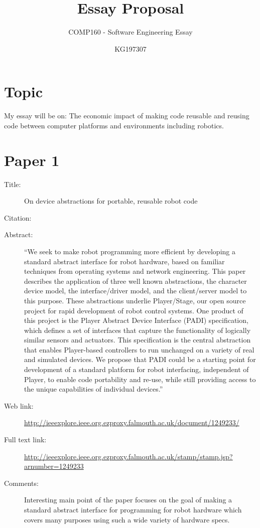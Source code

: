 \documentclass{scrartcl}
\title{Essay Proposal}
\subtitle{COMP160 - Software Engineering Essay}
\author{KG197307}
\begin{document}
\maketitle

\section*{Topic}

My essay will be on:
The economic impact of making code reusable and reusing code between computer platforms and environments including robotics.

\section*{Paper 1}
\begin{description}
\item[Title:] On device abstractions for portable, reusable robot code
\item[Citation:] \cite{RobotVaughan}
\item[Abstract:] ``We seek to make robot programming more efficient by developing a standard abstract interface for robot hardware, based on familiar techniques from operating systems and network engineering. This paper describes the application of three well known abstractions, the character device model, the interface/driver model, and the client/server model to this purpose. These abstractions underlie Player/Stage, our open source project for rapid development of robot control systems. One product of this project is the Player Abstract Device Interface (PADI) specification, which defines a set of interfaces that capture the functionality of logically similar sensors and actuators. This specification is the central abstraction that enables Player-based controllers to run unchanged on a variety of real and simulated devices. We propose that PADI could be a starting point for development of a standard platform for robot interfacing, independent of Player, to enable code portability and re-use, while still providing access to the unique capabilities of individual devices.''
\item[Web link:] \url{http://ieeexplore.ieee.org.ezproxy.falmouth.ac.uk/document/1249233/}
\item[Full text link:] \url{http://ieeexplore.ieee.org.ezproxy.falmouth.ac.uk/stamp/stamp.jsp?arnumber=1249233}
\item[Comments:] Interesting main point of the paper focuses on the goal of making a standard abstract interface for programming for robot hardware which covers many purposes using such a wide variety of hardware specs.
\end{description}
\end{document}
